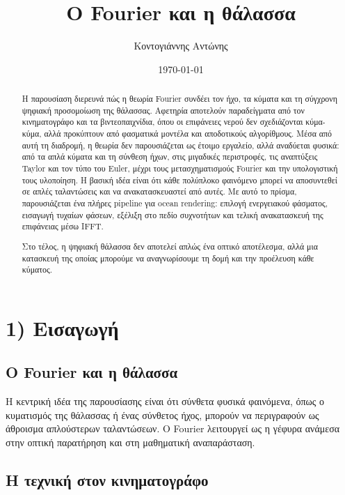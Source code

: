 \documentclass[
  a4paper,
  11pt,
]{article}
\title{Ο Fourier και η θάλασσα}
\author{Κοντογιάννης Αντώνης}
\date{\today}
\begin{document}
\maketitle


\begin{abstract}
Η παρουσίαση διερευνά πώς η θεωρία Fourier συνδέει τον ήχο, τα κύματα και τη σύγχρονη ψηφιακή προσομοίωση της θάλασσας. Αφετηρία αποτελούν παραδείγματα από τον κινηματογράφο και τα βιντεοπαιχνίδια, όπου οι επιφάνειες νερού δεν σχεδιάζονται κύμα-κύμα, αλλά προκύπτουν από φασματικά μοντέλα και αποδοτικούς αλγορίθμους.
Μέσα από αυτή τη διαδρομή, η θεωρία δεν παρουσιάζεται ως έτοιμο εργαλείο, αλλά αναδύεται φυσικά: από τα απλά κύματα και τη σύνθεση ήχων, στις μιγαδικές περιστροφές, τις αναπτύξεις Taylor και τον τύπο του Euler, μέχρι τους μετασχηματισμούς Fourier και την υπολογιστική τους υλοποίηση.
Η βασική ιδέα είναι ότι κάθε πολύπλοκο φαινόμενο μπορεί να αποσυντεθεί σε απλές ταλαντώσεις και να ανακατασκευαστεί από αυτές. Με αυτό το πρίσμα, παρουσιάζεται ένα πλήρες pipeline για ocean rendering: επιλογή ενεργειακού φάσματος, εισαγωγή τυχαίων φάσεων, εξέλιξη στο πεδίο συχνοτήτων και τελική ανακατασκευή της επιφάνειας μέσω IFFT.

Στο τέλος, η ψηφιακή θάλασσα δεν αποτελεί απλώς ένα οπτικό αποτέλεσμα, αλλά μια κατασκευή της οποίας μπορούμε να αναγνωρίσουμε τη δομή και την προέλευση κάθε κύματος.
\end{abstract}

\section{1) Εισαγωγή}\label{ux3b5ux3b9ux3c3ux3b1ux3b3ux3c9ux3b3ux3ae}

\subsection{Ο Fourier και η
θάλασσα}\label{ux3bf-fourier-ux3baux3b1ux3b9-ux3b7-ux3b8ux3acux3bbux3b1ux3c3ux3c3ux3b1}

Η κεντρική ιδέα της παρουσίασης είναι ότι σύνθετα φυσικά φαινόμενα, όπως
ο κυματισμός της θάλασσας ή ένας σύνθετος ήχος, μπορούν να περιγραφούν
ως άθροισμα απλούστερων ταλαντώσεων. Ο Fourier λειτουργεί ως η γέφυρα
ανάμεσα στην οπτική παρατήρηση και στη μαθηματική αναπαράσταση.

\subsection{Η τεχνική στον
κινηματογράφο}\label{ux3b7-ux3c4ux3b5ux3c7ux3bdux3b9ux3baux3ae-ux3c3ux3c4ux3bfux3bd-ux3baux3b9ux3bdux3b7ux3bcux3b1ux3c4ux3bfux3b3ux3c1ux3acux3c6ux3bf}
\end{document}
